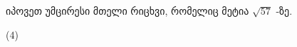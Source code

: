 იპოვეთ უმცირესი მთელი რიცხვი, რომელიც მეტია \(\sqrt{57}\) -ზე.

\vspace*{0.5cm}
\begin{tasks} (4)
\end{tasks}